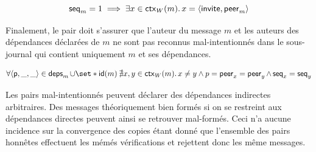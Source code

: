 \begin{equation*}
    \operatorname{\mathsf{seq}}_m = 1 \implies \exists x \in \operatorname{\mathsf{ctx}}_W(m) \ldotp x = \langle\operatorname{\mathsf{invite}}, \operatorname{\mathsf{peer}}_m\rangle
\end{equation*}

%

Finalement, le pair doit s'assurer que l'auteur du message $m$ et les auteurs des dépendances déclarées de $m$ ne sont pas reconnus mal-intentionnés dans le sous-journal qui contient uniquement $m$ et ses dépendances.


\begin{equation*}
    \forall \tuple*{\trm{p}, \_, \_} \in \trm{deps}_m \cup \set*{\trm{id}(m)} \:\nexists x, y \in \trm{ctx}_W(m) \qsep x \neq y \land p = \trm{peer}_x = \trm{peer}_y \land \trm{seq}_x = \trm{seq}_y
\end{equation*}

\begin{remark}
Les pairs mal-intentionnés peuvent déclarer des dépendances indirectes arbitraires.
Des messages théoriquement bien formés si on se restreint aux dépendances directes peuvent ainsi se retrouver mal-formés.
Ceci n'a aucune incidence sur la convergence des copies étant donné que l'ensemble des pairs honnêtes effectuent les mémés vérifications et rejettent donc les même messages.
\end{remark}


